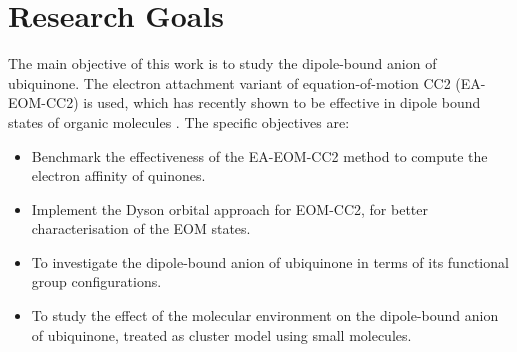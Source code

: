 \section{Research Goals}
The main objective of this work is to study the dipole-bound anion of ubiquinone. The electron attachment variant of equation-of-motion CC2 (EA-EOM-CC2) is used, which has recently shown to be effective in dipole bound states of organic molecules \cite{paran2024performance}. The specific objectives are:
\begin{itemize}
  \item Benchmark the effectiveness of the EA-EOM-CC2 method to compute the electron affinity of quinones.
  \item Implement the Dyson orbital approach for EOM-CC2, for better characterisation of the EOM states.
  \item To investigate the dipole-bound anion of ubiquinone in terms of its functional group configurations.
  \item To study the effect of the molecular environment on the dipole-bound anion of ubiquinone, treated as cluster model using small molecules.
\end{itemize}

\cleardoublepage

